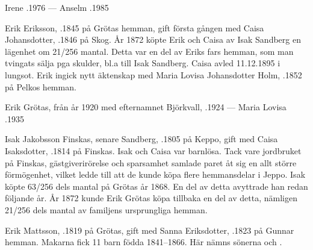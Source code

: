 Irene .1976  ---  Anselm .1985


Erik Eriksson, .1845 på Grötas hemman, gift första gången med Caisa Johansdotter, .1846 på Skog. År 1872 köpte Erik och Caisa av Isak Sandberg en lägenhet om 21/256 mantal. Detta var en del av  Eriks fars hemman, som man tvingats sälja pga  skulder, bl.a till Isak Sandberg. Caisa avled 11.12.1895 i lungsot. Erik ingick nytt äktenskap med Maria Lovisa Johansdotter Holm, .1852 på Pelkos hemman.
\begin{jhchildren}
  \item {}
  \item {}
  \item {}
  \item {}
  \item {}
\end{jhchildren}

Erik Grötas, från år 1920 med efternamnet Björkvall, .1924  ---  Maria Lovisa .1935


Isak Jakobsson Finskas, senare Sandberg, .1805 på Keppo, gift med Caisa Isaksdotter, .1814 på Finskas. Isak och Caisa var barnlösa. Tack vare jordbruket på Finskas, gästgiverirörelse och sparsamhet samlade paret åt sig en allt större förmögenhet, vilket ledde till att de kunde köpa flere hemmansdelar i Jeppo. Isak köpte 63/256 dels mantal på Grötas år 1868. En del av detta avyttrade han redan följande år. År 1872 kunde Erik Grötas köpa tillbaka en del av detta, nämligen 21/256 dels mantal av familjens ursprungliga hemman.


Erik Mattsson, .1819 på Grötas, gift med Sanna Eriksdotter, .1823 på Gunnar hemman. Makarna fick 11 barn födda 1841--1866. Här nämns sönerna  och .

